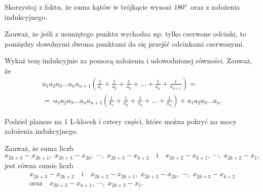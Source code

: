 \newpage
{}


\begin{hints_list}
	\item Skorzystaj z faktu, że suma kątów w trójkącie wynosi $180\degree$ oraz z założenia indukcyjnego.

	\item *

	\item *

	\item Zauważ, że jeśli z usuniętego punktu wychodza np. tylko czerwone odcinki, to pomiędzy dowolnymi dwoma punktami da się przejść odcinkami czerwonymi.

	\item Wykaż tezę indukcyjnie za pomocą założenia i udowodnionej równości. Zauważ, że 
	\begin{align*}
		a_1a_2a_3...a_na_{n+1}\left(\frac{1}{a_1} + \frac{1}{a_2} + \frac{1}{a_3} + ... + \frac{1}{a_n} + \frac{1}{a_{n + 1}}\right) = \\ =  \cdot a_1a_2a_3...a_na_{n+1}\left(\frac{1}{a_1} + \frac{1}{a_2} + \frac{1}{a_3} + ... + \frac{1}{a_n}\right) + a_1a_2a_3...a_n.
	\end{align*}

	\item Podziel plansze na 1 L-klocek i cztery części, które można pokryć na mocy założenia indukcyjnego.

	\item Zauważ, że suma liczb
	\[
		{x_{2k+3}-x_{2k+1}, \; x_{2k+3}-x_{2k},\; \cdots, \; x_{2k+3}-x_{k+2}} \quad \text{i} \quad {x_{2k+2}-x_{k+1},\; \cdots, \; x_{2k+2}-x_1},
	\]
	jest równa sumie liczb
\begin{gather*}
	x_{2k+3} - x_{2k+2} \quad \text{i} \quad x_{2k+2} - x_{2k+1},\; x_{2k+2} - x_{2k},\; \cdots,\; x_{2k+3} - x_{k+2}  \\ \text{oraz} \quad {x_{2k+3} - x_{k+1},\; \cdots, \; x_{2k+3}-x_1}.
\end{gather*}
\end{hints_list}